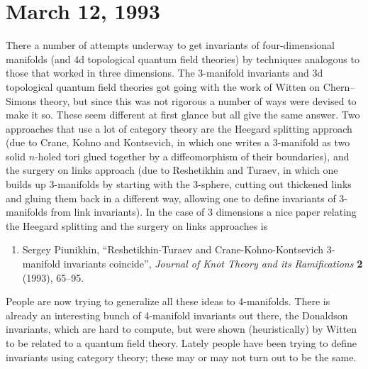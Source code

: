 \documentclass[12pt]{article}
\def\tightlist{}
\renewcommand{\texttt}[1]{%
  \begingroup
  \ttfamily
  \begingroup\lccode`~=`/\lowercase{\endgroup\def~}{/\discretionary{}{}{}}%
  \begingroup\lccode`~=`[\lowercase{\endgroup\def~}{[\discretionary{}{}{}}%
  \begingroup\lccode`~=`.\lowercase{\endgroup\def~}{.\discretionary{}{}{}}%
  \catcode`/=\active\catcode`[=\active\catcode`.=\active
  \scantokens{#1\noexpand}%
  \endgroup
}
\begin{document}
\hypertarget{week9}{%
\section{March 12, 1993}\label{week9}}


There a number of attempts underway to get invariants of
four-dimensional manifolds (and 4d topological quantum field theories)
by techniques analogous to those that worked in three dimensions. The
3-manifold invariants and 3d topological quantum field theories got
going with the work of Witten on Chern--Simons theory, but since this was
not rigorous a number of ways were devised to make it so. These seem
different at first glance but all give the same answer. Two approaches
that use a lot of category theory are the Heegard splitting approach
(due to Crane, Kohno and Kontsevich, in which one writes a 3-manifold as
two solid \(n\)-holed tori glued together by a diffeomorphism of their
boundaries), and the surgery on links approach (due to Reshetikhin and
Turaev, in which one builds up 3-manifolds by starting with the
3-sphere, cutting out thickened links and gluing them back in a
different way, allowing one to define invariants of 3-manifolds from
link invariants). In the case of 3 dimensions a nice paper relating the
Heegard splitting and the surgery on links approaches is

\begin{enumerate}
\def\labelenumi{\arabic{enumi})}
\setcounter{enumi}{1}
\item
 Sergey Piunikhin, ``Reshetikhin-Turaev and Crane-Kohno-Kontsevich 3-manifold invariants
coincide'', \emph{Journal of Knot Theory and its Ramifications} \textbf{2} (1993), 65--95.
\end{enumerate}

People are now trying to generalize all these ideas to 4-manifolds.
There is already an interesting bunch of 4-manifold invariants out
there, the Donaldson invariants, which are hard to compute, but were
shown (heuristically) by Witten to be related to a quantum field theory.
Lately people have been trying to define invariants using category
theory; these may or may not turn out to be the same.
\end{document}
